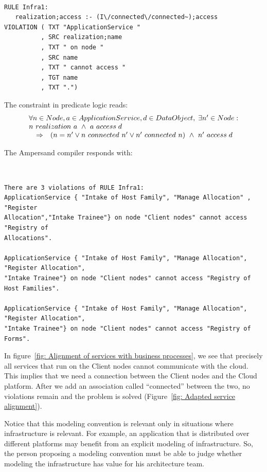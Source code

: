 \documentclass[sn-vancouver]{sn-jnl}%
\theoremstyle{thmstyleone}%
\theoremstyle{thmstyletwo}%
\theoremstyle{thmstylethree}%
\begin{document}
{\tt\small
\begin{lstlisting}[frame=single, label={mc3}, caption={}]
RULE Infra1:
   realization;access :- (I\/connected\/connected~);access
VIOLATION ( TXT "ApplicationService "
          , SRC realization;name
          , TXT " on node "
          , SRC name
          , TXT " cannot access "
          , TGT name
          , TXT ".")
\end{lstlisting}
}

The constraint in predicate logic reads:
\[\begin{array}{rcl}
   \multicolumn{3}{l}{\forall n \in Node, a\in Application Service, d\in DataObject, \;\exists n'\in Node:}\\
   \multicolumn{3}{l}{n\ realization\ a\ \wedge\ a\ access \;d}\\
   &\Rightarrow&(n=n'\vee n\ connected\ n'\vee n'\ connected\ n)\ \wedge\ n'\ access \;d
\end{array}\]

The Ampersand compiler responds with:

{\tt\small
\begin{lstlisting}[frame=single, label={mc3result}, caption={}]
There are 3 violations of RULE Infra1:
ApplicationService { "Intake of Host Family", "Manage Allocation" , "Register
Allocation","Intake Trainee"} on node "Client nodes" cannot access "Registry of
Allocations".

ApplicationService { "Intake of Host Family", "Manage Allocation", "Register Allocation",
"Intake Trainee"} on node "Client nodes" cannot access "Registry of Host Families".

ApplicationService { "Intake of Host Family", "Manage Allocation", "Register Allocation",
"Intake Trainee"} on node "Client nodes" cannot access "Registry of Forms".
\end{lstlisting}
}

In figure~\ref{fig: Alignment of services with business processes},
we see that precisely all services that run on the Client nodes cannot communicate with the cloud.
This implies that we need a connection between the Client nodes and the Cloud platform.
After we add an association called ``connected'' between the two, no violations remain and the problem is solved (Figure~\ref{fig: Adapted service alignment}).

Notice that this modeling convention is relevant only in situations where infrastructure is relevant.
For example, an application that is distributed over different platforms may benefit from an explicit modeling of infrastructure.
So, the person proposing a modeling convention must be able to judge whether modeling the infrastructure has value for his architecture team.
\end{document}
